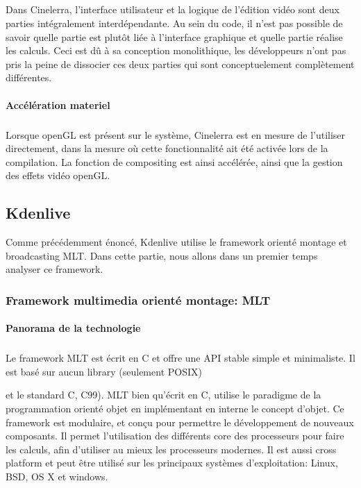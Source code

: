 \subparagraph{}

Dans Cinelerra, l'interface utilisateur et la logique de l'édition
vidéo sont deux parties intégralement interdépendante. Au sein du
code, il n'est pas possible de savoir quelle partie est plutôt liée
à l'interface graphique et quelle partie réalise les calculs. Ceci
est dû à sa conception monolithique, les développeurs n'ont pas
pris la peine de dissocier ces deux parties qui sont conceptuelement
complètement différentes.

\paragraph{Accélération materiel}

\subparagraph{}

Lorsque openGL est présent sur le système, Cinelerra
est en mesure de l'utiliser directement, dans la mesure où cette
fonctionnalité ait été activée lors de la compilation.  La fonction
de compositing est ainsi accélérée, ainsi que la gestion des effets
vidéo openGL.

\subsection {Kdenlive}

Comme précédemment énoncé, Kdenlive utilise le framework orienté
montage et broadcasting MLT. Dans cette partie, nous allons
dans un premier temps analyser ce framework.

\subsubsection {Framework multimedia orienté montage: MLT}

\paragraph {Panorama de la technologie} %

\subparagraph{}

Le framework MLT est écrit en C et offre une API
stable simple et minimaliste. Il est basé sur aucun library (seulement
POSIX)

 et le standard C, C99). MLT
bien qu'écrit en C, utilise le paradigme de la programmation orienté
objet en implémentant en interne le concept d'objet. Ce framework
est modulaire, et conçu pour permettre le développement de nouveaux
composants. Il permet l'utilisation des différents core des processeurs
pour faire les calculs, afin d'utiliser au mieux les processeurs
modernes. Il est aussi cross platform et peut être utilisé sur les
principaux systèmes d'exploitation: Linux, BSD, OS X et windows.

